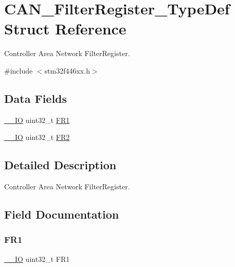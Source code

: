 \hypertarget{struct_c_a_n___filter_register___type_def}{}\section{C\+A\+N\+\_\+\+Filter\+Register\+\_\+\+Type\+Def Struct Reference}
\label{struct_c_a_n___filter_register___type_def}


Controller Area Network Filter\+Register.  




{\ttfamily \#include $<$stm32f446xx.\+h$>$}

\subsection*{Data Fields}
\begin{DoxyCompactItemize}
\item 
\mbox{\hyperlink{core__sc300_8h_aec43007d9998a0a0e01faede4133d6be}{\+\_\+\+\_\+\+IO}} uint32\+\_\+t \mbox{\hyperlink{struct_c_a_n___filter_register___type_def_a92036953ac673803fe001d843fea508b}{F\+R1}}
\item 
\mbox{\hyperlink{core__sc300_8h_aec43007d9998a0a0e01faede4133d6be}{\+\_\+\+\_\+\+IO}} uint32\+\_\+t \mbox{\hyperlink{struct_c_a_n___filter_register___type_def_a7f7d80b45b7574463d7030fc8a464582}{F\+R2}}
\end{DoxyCompactItemize}


\subsection{Detailed Description}
Controller Area Network Filter\+Register. 

\subsection{Field Documentation}
\mbox{\label{struct_c_a_n___filter_register___type_def_a92036953ac673803fe001d843fea508b}} 
\subsubsection{\texorpdfstring{F\+R1}{FR1}}
{\footnotesize\ttfamily \mbox{\hyperlink{core__sc300_8h_aec43007d9998a0a0e01faede4133d6be}{\+\_\+\+\_\+\+IO}} uint32\+\_\+t F\+R1}

